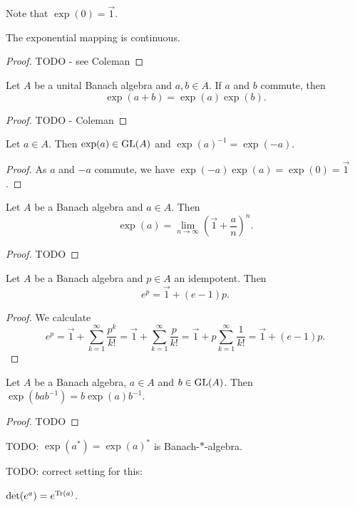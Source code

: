 Note that $\exp(0) = \vec{1}$.

\begin{lemma} \label{continuityExp}
The exponential mapping is continuous.
\end{lemma}
\begin{proof}
TODO - see Coleman
\end{proof}

\begin{proposition} \label{factorisationCommutingExponentials}
Let $A$ be a unital Banach algebra and $a,b\in A$. If $a$ and $b$ commute, then
\[ \exp(a+b) = \exp(a)\exp(b). \]
\end{proposition}
\begin{proof}
TODO - Coleman
\end{proof}
\begin{corollary}
Let $a\in A$. Then $\exp(a)\in \operatorname{GL}(A)$ and $\exp(a)^{-1} = \exp(-a)$.
\end{corollary}
\begin{proof}
As $a$ and $-a$ commute, we have $\exp(-a)\exp(a) = \exp(0) = \vec{1}$.
\end{proof}

\begin{lemma}
Let $A$ be a Banach algebra and $a\in A$. Then
\[ \exp(a) = \lim_{n\to\infty} \left(\vec{1} + \frac{a}{n}\right)^n. \]
\end{lemma}
\begin{proof}
TODO
\end{proof}

\begin{lemma}
Let $A$ be a Banach algebra and $p\in A$ an idempotent. Then
\[ e^p = \vec{1} + (e-1)p. \]
\end{lemma}
\begin{proof}
We calculate
\[ e^p = \vec{1} + \sum_{k=1}^\infty \frac{p^k}{k!} = \vec{1} + \sum_{k=1}^\infty \frac{p}{k!} = \vec{1} + p\sum_{k=1}^\infty \frac{1}{k!} = \vec{1} + (e-1)p. \]
\end{proof}

\begin{lemma}
Let $A$ be a Banach algebra, $a\in A$ and $b\in \operatorname{GL}(A)$. Then $\exp(bab^{-1}) = b\exp(a)b^{-1}$.
\end{lemma}
\begin{proof}
TODO
\end{proof}

TODO: $\exp(a^*) = \exp(a)^*$ is Banach-$*$-algebra.

TODO: correct setting for this:
\begin{proposition}
$\det(e^a) = e^{\operatorname{Tr}(a)}$.
\end{proposition}

